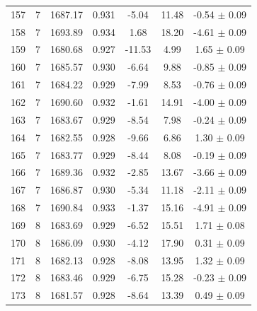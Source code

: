 \begin{longtable}{c c c c c c c}
    157 & 7 & 1687.17 & 0.931 & \cellcolor{aicyellow}-5.04 & \cellcolor{aicred}11.48 & -0.54 $\pm$ 0.09 \\
    158 & 7 & 1693.89 & 0.934 & 1.68 & \cellcolor{aicred}18.20 & \cellcolor{aiclightred}-4.61 $\pm$ 0.09 \\
    159 & 7 & 1680.68 & 0.927 & \cellcolor{aicgreen}-11.53 & \cellcolor{aicorange}4.99 & \cellcolor{aicyellow}1.65 $\pm$ 0.09 \\
    160 & 7 & 1685.57 & 0.930 & \cellcolor{aicyellow}-6.64 & \cellcolor{aiclightred}9.88 & -0.85 $\pm$ 0.09 \\
    161 & 7 & 1684.22 & 0.929 & \cellcolor{aiclightgreen}-7.99 & \cellcolor{aiclightred}8.53 & -0.76 $\pm$ 0.09 \\
    162 & 7 & 1690.60 & 0.932 & -1.61 & \cellcolor{aicred}14.91 & \cellcolor{aiclightred}-4.00 $\pm$ 0.09 \\
    163 & 7 & 1683.67 & 0.929 & \cellcolor{aiclightgreen}-8.54 & \cellcolor{aiclightred}7.98 & -0.24 $\pm$ 0.09 \\
    164 & 7 & 1682.55 & 0.928 & \cellcolor{aiclightgreen}-9.66 & \cellcolor{aiclightred}6.86 & \cellcolor{aicyellow}1.30 $\pm$ 0.09 \\
    165 & 7 & 1683.77 & 0.929 & \cellcolor{aiclightgreen}-8.44 & \cellcolor{aiclightred}8.08 & -0.19 $\pm$ 0.09 \\
    166 & 7 & 1689.36 & 0.932 & \cellcolor{aiclightyellow}-2.85 & \cellcolor{aicred}13.67 & \cellcolor{aiclightred}-3.66 $\pm$ 0.09 \\
    167 & 7 & 1686.87 & 0.930 & \cellcolor{aicyellow}-5.34 & \cellcolor{aicred}11.18 & \cellcolor{aicorange}-2.11 $\pm$ 0.09 \\
    168 & 7 & 1690.84 & 0.933 & -1.37 & \cellcolor{aicred}15.16 & \cellcolor{aiclightred}-4.91 $\pm$ 0.09 \\
    169 & 8 & 1683.69 & 0.929 & \cellcolor{aicyellow}-6.52 & \cellcolor{aicred}15.51 & \cellcolor{aicyellow}1.71 $\pm$ 0.08 \\
    170 & 8 & 1686.09 & 0.930 & \cellcolor{aicyellow}-4.12 & \cellcolor{aicred}17.90 & 0.31 $\pm$ 0.09 \\
    171 & 8 & 1682.13 & 0.928 & \cellcolor{aiclightgreen}-8.08 & \cellcolor{aicred}13.95 & \cellcolor{aicyellow}1.32 $\pm$ 0.09 \\
    172 & 8 & 1683.46 & 0.929 & \cellcolor{aicyellow}-6.75 & \cellcolor{aicred}15.28 & -0.23 $\pm$ 0.09 \\
    173 & 8 & 1681.57 & 0.928 & \cellcolor{aiclightgreen}-8.64 & \cellcolor{aicred}13.39 & 0.49 $\pm$ 0.09 \\

\end{longtable}
